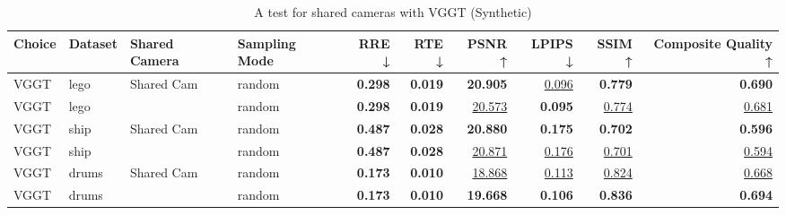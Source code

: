 \begin{table}[H]
\caption{A test for shared cameras with VGGT (Synthetic)}
\label{tab:06_shared_camera_vggt_synthetic}
\footnotesize
\begin{tabular}{llllrrrrrr}
\toprule
Choice & Dataset & Shared Camera & Sampling Mode & RRE ↓ & RTE ↓ & PSNR ↑ & LPIPS ↓ & SSIM ↑ & Composite Quality ↑ \\
\midrule
VGGT & lego & Shared Cam & random & \textbf{0.298} & \textbf{0.019} & \textbf{20.905} & \underline{0.096} & \textbf{0.779} & \textbf{0.690} \\
VGGT & lego &  & random & \textbf{0.298} & \textbf{0.019} & \underline{20.573} & \textbf{0.095} & \underline{0.774} & \underline{0.681} \\
\midrule
VGGT & ship & Shared Cam & random & \textbf{0.487} & \textbf{0.028} & \textbf{20.880} & \textbf{0.175} & \textbf{0.702} & \textbf{0.596} \\
VGGT & ship &  & random & \textbf{0.487} & \textbf{0.028} & \underline{20.871} & \underline{0.176} & \underline{0.701} & \underline{0.594} \\
\midrule
VGGT & drums & Shared Cam & random & \textbf{0.173} & \textbf{0.010} & \underline{18.868} & \underline{0.113} & \underline{0.824} & \underline{0.668} \\
VGGT & drums &  & random & \textbf{0.173} & \textbf{0.010} & \textbf{19.668} & \textbf{0.106} & \textbf{0.836} & \textbf{0.694} \\
\bottomrule
\end{tabular}
\end{table}